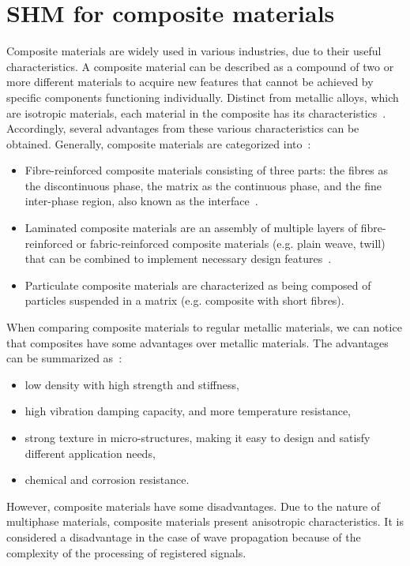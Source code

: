 \section[SHM for composite materials]{SHM for composite materials}
\label{sec21}
Composite materials are widely used in various industries, due to their useful character\-istics. 
A composite material can be described as a compound of two or more different materials to acquire new features that cannot be achieved by specific components functioning individually.
Distinct from metallic alloys, which are isotropic materials, each material in the composite has its characteristics~\cite{Campbell2010}.
Accordingly, several advantag\-es from these various characteristics can be obtained.
Generally, composite materials are categorized into~\cite{Jones1999}:
\begin{itemize}
	\item Fibre-reinforced composite materials consisting of three parts: the fibres as the discontinuous phase, the matrix as the continuous phase, and the fine inter-phase region, also known as the interface~\cite{Cantwell1991}.
	\item Laminated composite materials are an assembly of multiple layers of fibre-reinforc\-ed or fabric-reinforced composite materials (e.g. plain weave, twill) that can be combined to implement necessary design features~\cite{Ramirez1999}.
	\item Particulate composite materials are characterized as being composed of particles suspended in a matrix (e.g. composite with short fibres).
\end{itemize}

When comparing composite materials to regular metallic materials, we can notice that composites have some advantages over metallic materials. 
The advantages can be summarized as~\cite{Campbell2010}:
\begin{itemize}
	\item low density with high strength and stiffness,
	\item high vibration damping capacity, and more temperature resistance,
	\item strong texture in micro-structures, making it easy to design and satisfy different application needs, 
	\item chemical and corrosion resistance.	
\end{itemize}

However, composite materials have some disadvantages.
Due to the nature of multiphase materials, composite materials present anisotropic characteristics.
It is considered a disadvantage in the case of wave propagation because of the complexity of the processing of registered signals.

